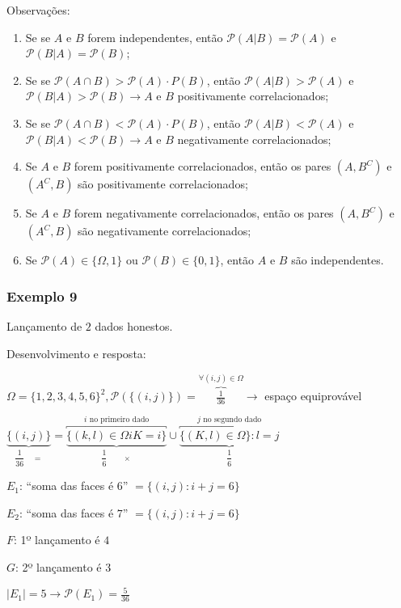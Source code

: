 \documentclass[a4paper]{article}
\begin{document}
	Observações:
	
	\begin{enumerate}
		\item Se se $A$ e $B$ forem independentes, então $\mathcal{P}(A|B)=\mathcal{P}(A)$ e $\mathcal{P}(B|A)=\mathcal{P}(B)$;
		\item Se se $\mathcal{P}(A \cap B) > \mathcal{P}(A) \cdot P(B)$, então $\mathcal{P}(A|B) > \mathcal{P}(A)$ e $\mathcal{P}(B|A) > \mathcal{P}(B) \rightarrow A$ e $B$ positivamente correlacionados;
		\item Se se $\mathcal{P}(A \cap B) < \mathcal{P}(A) \cdot P(B)$, então $\mathcal{P}(A|B) < \mathcal{P}(A)$ e $\mathcal{P}(B|A) < \mathcal{P}(B) \rightarrow A$ e $B$ negativamente correlacionados;
		\item Se $A$ e $B$ forem positivamente correlacionados, então os pares $(A,B^{C})$ e $(A^{C}, B)$ são positivamente correlacionados;
		\item Se $A$ e $B$ forem negativamente correlacionados, então os pares $(A,B^{C})$ e $(A^{C}, B)$ são negativamente correlacionados;
		\item Se $\mathcal{P}(A) \in \{\varOmega,1\}$ ou $\mathcal{P}(B) \in \{0,1\}$, então $A$ e $B$ são independentes.
	\end{enumerate}
	
	\subsubsection{Exemplo 9}
	
	\noindent Lançamento de $2$ dados honestos.
	
	Desenvolvimento e resposta:
	
	$\varOmega = \{1,2,3,4,5,6\}^{2}, \mathcal{P}(\{(i,j)\}) = \overbrace{\frac{1}{36}}^{\forall(i,j) \in \varOmega} \rightarrow$ espaço equiprovável
	
	$\underbrace{\{ (i,j) \}}_{\dfrac{1}{36} \quad =} = \underbrace{\overbracket{\{ (k,l) \in \varOmega i K = i \}}^\text{$i$ no primeiro dado}}_{\dfrac{1}{6} \qquad \times} \cup \underbrace{\overbracket{\{ (K,l) \in \varOmega \}: l = j}^\text{$j$ no segundo dado}}_{\dfrac{1}{6}}$
	
	$E_{1}$: ``soma das faces é $6$'' $= \{(i,j): i+j=6\}$
	
	$E_{2}$: ``soma das faces é $7$'' $= \{(i,j): i+j=6\}$
	
	$F$: 1º lançamento é $4$
	
	$G$: 2º lançamento é $3$
	
	$|E_{1}|=5 \rightarrow \mathcal{P}(E_{1}) = \frac{5}{36}$
	
\end{document}
